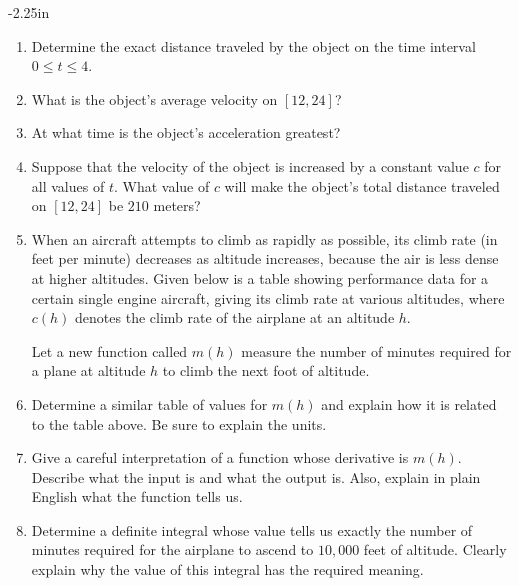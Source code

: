 \begin{adjustwidth*}{}{-2.25in}
\begin{multicols*}{2}
\begin{enumerate}[1),resume]
    \ba
  	\item Determine the exact distance traveled by the object on the time interval $0 \le t \le 4$.
	\item What is the object's average velocity on $[12,24]$?
	\item At what time is the object's acceleration greatest?
	\item Suppose that the velocity of the object is increased by a constant value $c$ for all values of $t$.  What value of $c$ will make the object's total distance traveled on $[12,24]$ be $210$ meters?
  \ea
  
    \item When an aircraft attempts to climb as rapidly as
possible, its climb rate (in feet per minute) decreases as altitude
increases, because the air is less dense at higher altitudes.
Given below is a table showing performance data for a certain
single engine aircraft, giving its climb rate at various altitudes, where  $c(h)$ denotes the climb rate of the airplane at an altitude $h$.


\begin{center}
\end{center}


 Let a new function called $m(h)$ measure
the number of minutes required for a plane at altitude $h$ to climb the
next foot of altitude.
\ba
	\item Determine a similar table of values for $m(h)$ and explain how it is related to the table above.  Be sure to explain the units.

	\item Give a careful interpretation of a function whose derivative
is $m(h)$.  Describe what the input is and what the output is.  Also,
explain in plain English what the function tells us.

	\item Determine a definite integral whose value tells us exactly the number of minutes required for the airplane to ascend to
$10,000$ feet of altitude.  Clearly explain why the value of this integral has the required meaning.


\end{enumerate}
\end{multicols*}
\end{adjustwidth*}
